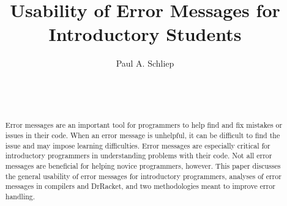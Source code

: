 \documentclass{sig-alternate}
\begin{document}

\title{Usability of Error Messages for Introductory Students}


\author{
\alignauthor
Paul A. Schliep\\
	\\
	\\
	\\
}

\maketitle
\begin{abstract}
Error messages are an important tool for programmers to help find and fix mistakes or issues in their code.
When an error message is unhelpful, it can be difficult to find the issue and may impose learning difficulties.
Error messages are especially critical for introductory programmers in understanding problems with their code.
Not all error messages are beneficial for helping novice programmers, however.
This paper discusses the general usability of error messages for introductory programmers, analyses of error messages in compilers and DrRacket, and two methodologies meant to improve error handling.

\end{abstract}

\end{document}
